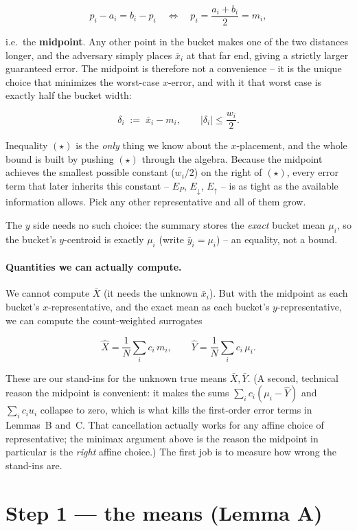 \documentclass[11pt]{article}
\begin{document}
\[
p_i-a_i=b_i-p_i
\quad\Longleftrightarrow\quad
p_i=\frac{a_i+b_i}{2}=m_i,
\]

i.e.\ the \textbf{midpoint}. Any other point in the bucket makes one of
the two distances longer, and the adversary simply places $\bar x_i$ at
that far end, giving a strictly larger guaranteed error. The midpoint
is therefore not a convenience -- it is the unique choice that
minimizes the worst-case $x$-error, and with it that worst case is
exactly half the bucket width:

\[
\delta_i \;:=\; \bar x_i - m_i,
\qquad
|\delta_i|\le \frac{w_i}{2}.
\tag{$\star$}
\]

Inequality $(\star)$ is the \emph{only} thing we know about the
$x$-placement, and the whole bound is built by pushing $(\star)$
through the algebra. Because the midpoint achieves the smallest
possible constant ($w_i/2$) on the right of $(\star)$, every error term
that later inherits this constant -- $E_P$, $E_\downarrow$,
$E_\uparrow$ -- is as tight as the available information allows. Pick
any other representative and all of them grow.

The $y$ side needs no such choice: the summary stores the
\emph{exact} bucket mean $\mu_i$, so the bucket's $y$-centroid is
exactly $\mu_i$ (write $\bar y_i=\mu_i$) -- an equality, not a bound.

\paragraph{Quantities we can actually compute.}
We cannot compute $\bar X$ (it needs the unknown $\bar x_i$). But with
the midpoint as each bucket's $x$-representative, and the exact mean as
each bucket's $y$-representative, we can compute the count-weighted
surrogates

\[
\hat X=\frac1N\sum_i c_i\,m_i,
\qquad
\hat Y=\frac1N\sum_i c_i\,\mu_i.
\]

These are our stand-ins for the unknown true means $\bar X,\bar Y$.
(A second, technical reason the midpoint is convenient: it makes the
sums $\sum_i c_i(\mu_i-\hat Y)$ and $\sum_i c_i u_i$ collapse to zero,
which is what kills the first-order error terms in Lemmas~B and~C.
That cancellation actually works for any affine choice of
representative; the minimax argument above is the reason the midpoint
in particular is the \emph{right} affine choice.) The first job is to
measure how wrong the stand-ins are.

\section{Step 1 --- the means (Lemma A)}
\end{document}
